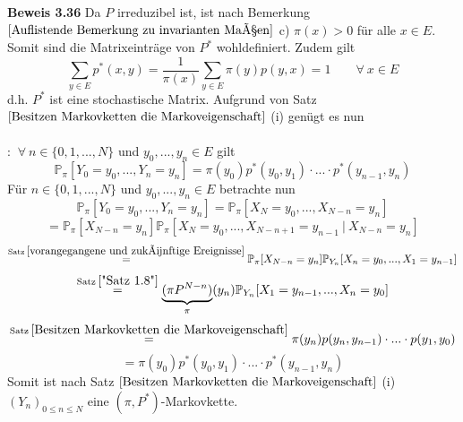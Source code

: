 \textbf{Beweis 3.36}
Da $P$ irreduzibel ist, ist nach Bemerkung $\ref{Auflistende Bemerkung zu invarianten Maßen}$ c) $\pi(x) > 0$ für alle $x \in E$. Somit sind die Matrixeinträge von $P^{*}$ wohldefiniert. Zudem gilt
\begin{equation*}
\sum_{y \in E} p^{*}(x,y) = \dfrac{1}{\pi (x)} \sum_{y \in E} \pi (y) p(y,x) = 1 \qquad \forall \: x \in E
\end{equation*}
d.h. $P^{*}$ ist eine stochastische Matrix. Aufgrund von Satz $\ref{Besitzen Markovketten die Markoveigenschaft}$ (i) genügt es nun
\\
\\
: $\: \forall \: n \in \lbrace 0,1,...,N \rbrace$ und $y_{0},...,y_{n} \in E$ gilt
\begin{equation*}
\mathbb{P}_{\pi} [Y_{0} = y_{0},...,Y_{n}=y_{n}] = \pi(y_{0})p^{*}(y_{0},y_{1}) \cdot ... \cdot p^{*}(y_{n-1},y_{n})
\end{equation*}
Für $n \in \lbrace 0,1,...,N \rbrace$ und $y_{0},...,y_{n} \in E$ betrachte nun
\begin{equation*}
\mathbb{P}_{\pi} [Y_{0} = y_{0},...,Y_{n}=y_{n}] = \mathbb{P}_{\pi} [X_{N} = y_{0},...,X_{N-n}=y_{n}] 
\end{equation*}
\begin{equation*}
= \mathbb{P}_{\pi}[X_{N-n} = y_{n}] \mathbb{P}_{\pi} [X_{N} = y_{0},...,X_{N-n+1}=y_{n-1} \: | \: X_{N-n}=y_{n}] 
\end{equation*}
\begin{equation*}
\stackrel{\mathrm{Satz} \: \ref{vorangegangene und zukünftige Ereignisse}}{=} \mathbb{P}_{\pi}[X_{N-n} = y_{n}] \mathbb{P}_{Y_{n}} [X_{n} = y_{0},...,X_{1}=y_{n-1}] 
\end{equation*}
\begin{equation*}
\stackrel{\mathrm{Satz} \: \ref{"Satz 1.8"}}{=} \underbrace{(\pi P^{N-n})}_{\pi}(y_{n}) \mathbb{P}_{Y_{n}} [X_{1} = y_{n-1},...,X_{n}=y_{0}] 
\end{equation*}
\begin{equation*}
\stackrel{\mathrm{Satz} \: \ref{Besitzen Markovketten die Markoveigenschaft}}{=} \pi(y_{n}) p(y_{n},y_{n-1}) \cdot ... \cdot p(y_{1},y_{0})
\end{equation*}
\begin{equation*}
= \pi(y_{0})p^{*}(y_{0},y_{1}) \cdot ... \cdot p^{*}(y_{n-1},y_{n})
\end{equation*}
Somit ist nach Satz $\ref{Besitzen Markovketten die Markoveigenschaft}$ (i) $(Y_{n})_{0 \leq n \leq N}$ eine $(\pi,P^{*})$-Markovkette.

